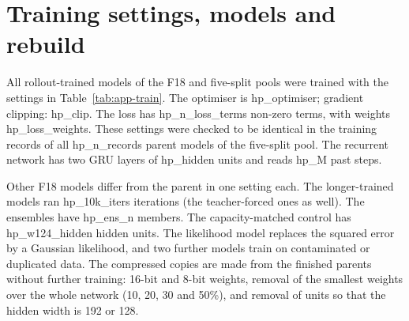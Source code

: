 
\FloatBarrier
\section{Training settings, models and rebuild}\label{app:A1}
All rollout-trained models of the F18 and five-split pools were trained with the settings in Table~\ref{tab:app-train}.
The optimiser is {{hp_optimiser}}; gradient clipping: {{hp_clip}}. The loss has {{hp_n_loss_terms}} non-zero terms,
with weights {{hp_loss_weights}}. These settings were checked to be identical in the training records of all
{{hp_n_records}} parent models of the five-split pool. The recurrent network has two GRU layers of {{hp_hidden}} units
and reads {{hp_M}} past steps.

\begin{table}[h]
\centering
\caption{What differs between the rollout-trained parent, the teacher-forced models and the $N{=}1$ models. A blank means
the setting equals the parent's. Records compared: {{hp_tf_n_records}} teacher-forced and {{hp_n1_n_records}} $N{=}1$ models.}
\label{tab:app-train}
\footnotesize
{}
\end{table}

Other F18 models differ from the parent in one setting each. The longer-trained models ran {{hp_10k_iters}}
iterations (the teacher-forced ones as well). The ensembles have {{hp_ens_n}} members. The capacity-matched control has
{{hp_w124_hidden}} hidden units. The likelihood model replaces the squared error by a Gaussian likelihood, and two
further models train on contaminated or duplicated data. The compressed copies are made from the finished parents without
further training: 16-bit and 8-bit weights, removal of the smallest weights over the whole network (10, 20, 30 and
50\%), and removal of units so that the hidden width is 192 or 128.


